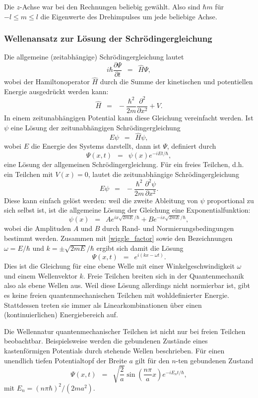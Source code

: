 \documentclass{article}
\newcommand{\widespace}{\enspace}
\newcommand{\wideeq}{\widespace = \widespace}
\newcommand{\pd}[2]{
    \frac{\partial #1}{\partial #2}
}
\begin{document}
Die $z$-Achse war bei den Rechnungen beliebig gewählt.
Also sind $\hbar m$ für $-l \leq m \leq l$ die Eigenwerte des Drehimpulses
um jede beliebige Achse.

\cite[157--161]{gri_qm}


\subsubsection{Wellenansatz zur Lösung der Schrödingergleichung}

Die allgemeine (zeitabhängige) Schrödingergleichung lautet
\[
    i \hbar \pd{\Psi}{t} \wideeq \hat H \Psi,
\]
wobei der Hamiltonoperator $\hat H$ durch die Summe der kinetischen und potentiellen
Energie ausgedrückt werden kann:
\[
    \hat H \wideeq -\frac{\hbar^2}{2m} \pd{^2}{x^2} + V.
\]
In einem zeitunabhängigen Potential kann diese Gleichung vereinfacht werden.
Ist $\psi$ eine Lösung der zeitunabhängigen Schrödingergleichung
\[
    E \psi \wideeq \hat H \psi,
\]
wobei $E$ die Energie des Systems darstellt, dann ist $\Psi$, definiert durch
\begin{equation}
    \tag{*}
    \label{wiggle_factor}
    \Psi(x, t) \wideeq \psi(x) e^{-i E t / \hbar},
\end{equation}
eine Lösung der allgemeinen Schrödingergleichung.
Für ein freies Teilchen, d.h. ein Teilchen mit $V(x) = 0$, lautet die zeitunabhängige
Schrödingergleichung
\[
    E \psi \wideeq -\frac{\hbar^2}{2m} \pd{^2 \psi}{x^2}.
\]
Diese kann einfach gelöst werden: weil die zweite Ableitung von $\psi$ proportional
zu sich selbst ist, ist die allgemeine Lösung der Gleichung eine Exponentialfunktion:
\[
    \psi(x) \wideeq A e^{i x \sqrt{2 m E} / \hbar}
    + B e^{- i x \sqrt{2 m E} / \hbar},
\]
wobei die Amplituden $A$ und $B$ durch Rand- und Normierungsbedingungen bestimmt
werden. Zusammen mit \eqref{wiggle_factor} sowie den Bezeichnungen
$\omega = E / \hbar$ und $k = \pm \sqrt{2 m E} / \hbar$ ergibt sich damit die Lösung
\[
    \Psi(x, t) \wideeq e^{i (k x - \omega t)}.
\]
Dies ist die Gleichung für eine ebene Welle mit einer Winkelgeschwindigkeit
$\omega$ und einem Wellenvektor $k$.
Freie Teilchen breiten sich in der Quantenmechanik also als ebene Wellen aus.
Weil diese Lösung allerdings nicht normierbar ist, gibt es keine
freien quantenmechanischen Teilchen mit wohldefinierter Energie.
Stattdessen treten sie immer als Linearkombinationen über einen
(kontinuierlichen) Energiebereich auf.

Die Wellennatur quantenmechanischer Teilchen ist nicht nur bei freien Teilchen
beobachtbar. Beispielsweise werden die gebundenen Zustände eines kastenförmigen
Potentials durch stehende Wellen beschrieben. Für einen unendlich tiefen
Potentialtopf der Breite $a$ gilt für den $n$-ten gebundenen Zustand
\[
    \Psi(x, t) \wideeq \sqrt{\frac 2 a} \sin \left(
        \frac{n \pi}{a} x
    \right)
    e^{-i E_n t / \hbar},
\]
mit $E_n = (n \pi \hbar)^2 / (2 m a^2)$.
\end{document}
